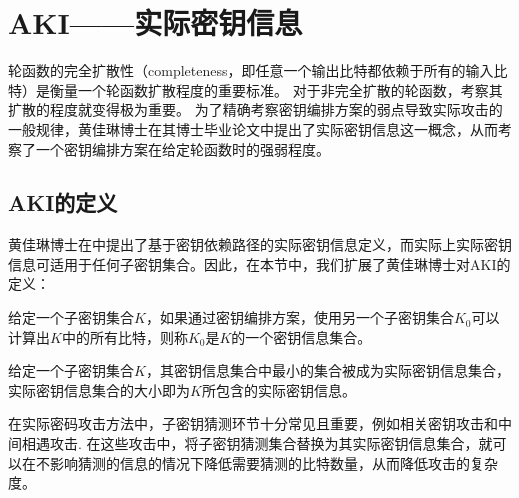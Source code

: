 
\chapter{AKI——实际密钥信息}
\label{chap:AKI}
轮函数的完全扩散性（completeness，即任意一个输出比特都依赖于所有的输入比特）是衡量一个轮函数扩散程度的重要标准。
对于非完全扩散的轮函数，考察其扩散的程度就变得极为重要。
为了精确考察密钥编排方案的弱点导致实际攻击的一般规律，黄佳琳博士在其博士毕业论文中提出了实际密钥信息这一概念，从而考察了一个密钥编排方案在给定轮函数时的强弱程度。
\section{AKI的定义}
黄佳琳博士在中提出了基于密钥依赖路径的实际密钥信息定义，而实际上实际密钥信息可适用于任何子密钥集合。因此，在本节中，我们扩展了黄佳琳博士对AKI的定义：
\begin{defn}
    给定一个子密钥集合$K$，如果通过密钥编排方案，使用另一个子密钥集合$K_0$可以计算出$K$中的所有比特，则称$K_0$是$K$的一个密钥信息集合。
\end{defn}
\begin{defn}
    给定一个子密钥集合$K$，其密钥信息集合中最小的集合被成为实际密钥信息集合，实际密钥信息集合的大小即为$K$所包含的实际密钥信息。
\end{defn}
在实际密码攻击方法中，子密钥猜测环节十分常见且重要，例如相关密钥攻击和中间相遇攻击.
在这些攻击中，将子密钥猜测集合替换为其实际密钥信息集合，就可以在不影响猜测的信息的情况下降低需要猜测的比特数量，从而降低攻击的复杂度。
